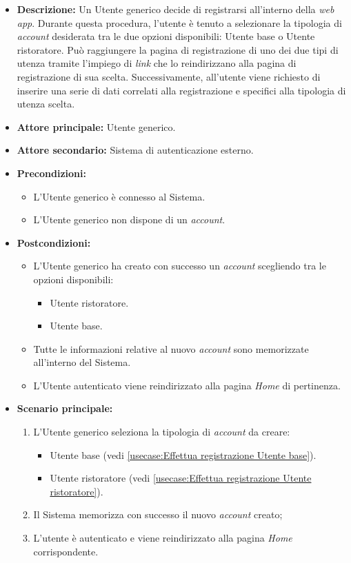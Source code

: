 \begin{itemize}
	\item \textbf{Descrizione:} Un Utente generico decide di registrarsi all'interno della \textit{web app}. 
    Durante questa procedura, l'utente è tenuto a selezionare la tipologia di \textit{account} desiderata tra le due opzioni disponibili: Utente base o Utente ristoratore.
    Può raggiungere la pagina di registrazione di uno dei due tipi di utenza tramite l'impiego di \textit{link} che lo reindirizzano alla pagina di registrazione di sua scelta. 
    Successivamente, all'utente viene richiesto di inserire una serie di dati correlati alla registrazione e specifici alla tipologia di utenza scelta.

	\item \textbf{Attore principale:} Utente generico.
	\item \textbf{Attore secondario:} Sistema di autenticazione esterno.
	\item \textbf{Precondizioni:}
        \begin{itemize}
            \item L'Utente generico è connesso al Sistema.
            \item L'Utente generico non dispone di un \textit{account}.
        \end{itemize}
	\item \textbf{Postcondizioni:}
        \begin{itemize} 
            \item L'Utente generico ha creato con successo un \textit{account} scegliendo tra le opzioni disponibili:
            \begin{itemize}
                \item Utente ristoratore.
                \item Utente base.
            \end{itemize}
            \item Tutte le informazioni relative al nuovo \textit{account} sono memorizzate all'interno del Sistema.
            \item L'Utente autenticato viene reindirizzato alla pagina \textit{Home} di pertinenza.
        \end{itemize}


	\item \textbf{Scenario principale:}
	      \begin{enumerate}
		      \item L'Utente generico seleziona la tipologia di \textit{account} da creare: 
		      \begin{itemize}
				\item Utente base (vedi \autoref{usecase:Effettua registrazione Utente base}).
				\item Utente ristoratore (vedi \autoref{usecase:Effettua registrazione Utente ristoratore}).
			  \end{itemize} 
              \item Il Sistema memorizza con successo il nuovo \textit{account} creato;
		      \item L'utente è autenticato e viene reindirizzato alla pagina \textit{Home} corrispondente.
	      \end{enumerate}
		

\end{itemize}

